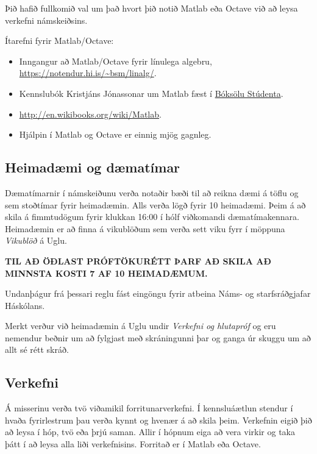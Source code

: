 \documentclass[A4paper,10pt,icelandic]{sphinxmanual}
\begin{document}
Þið hafið fullkomið val um það hvort þið notið Matlab eða Octave við að leysa verkefni námskeiðsins.

Ítarefni fyrir Matlab/Octave:
\begin{itemize}
\item {} 
Inngangur að Matlab/Octave fyrir línulega algebru, \href{https://notendur.hi.is/~bsm/linalg/}{https://notendur.hi.is/\textasciitilde{}bsm/linalg/}.

\item {} 
Kennslubók Kristjáns Jónassonar um Matlab fæst í \href{http://www.boksala.is/matlab-forritunarmal-fyrir-visindalega-utreikning.html}{Bóksölu Stúdenta}.

\item {} 
\href{http://en.wikibooks.org/wiki/Matlab}{http://en.wikibooks.org/wiki/Matlab}.

\item {} 
Hjálpin í Matlab og Octave er einnig mjög gagnleg.

\end{itemize}

\newpage
\subsection{Heimadæmi og dæmatímar}
\label{vidauki:heimadaemi-og-daematimar}
Dæmatímarnir í námskeiðunu verða notaðir bæði til að reikna dæmi á töflu og sem stoðtímar fyrir heimadæmin. Alls verða lögð fyrir 10 heimadæmi. Þeim á að skila á fimmtudögum fyrir klukkan 16:00 í hólf viðkomandi dæmatímakennara. Heimadæmin er að finna á vikublöðum sem verða sett viku fyrr í möppuna \emph{Vikublöð} á Uglu.

\textbf{TIL AÐ ÖÐLAST PRÓFTÖKURÉTT ÞARF AÐ SKILA AÐ MINNSTA KOSTI 7 AF 10 HEIMADÆMUM.}

Undanþágur frá þessari reglu fást eingöngu fyrir atbeina Náms- og starfsráðgjafar Háskólans.

Merkt verður við heimadæmin á Uglu undir \emph{Verkefni og hlutapróf} og eru nemendur beðnir um að fylgjast með skráningunni þar og ganga úr skuggu um að allt sé rétt skráð.


\subsection{Verkefni}
\label{vidauki:verkefni}
Á misserinu verða tvö viðamikil forritunarverkefni.
Í kennsluáætlun stendur í hvaða fyrirlestrum þau verða kynnt og hvenær á að skila þeim. Verkefnin eigið þið að leysa í hóp, tvö eða þrjú saman. Allir í hópnum eiga að vera virkir og taka þátt í að leysa alla liði verkefnisins. Forritað er í Matlab eða Octave.
\end{document}
